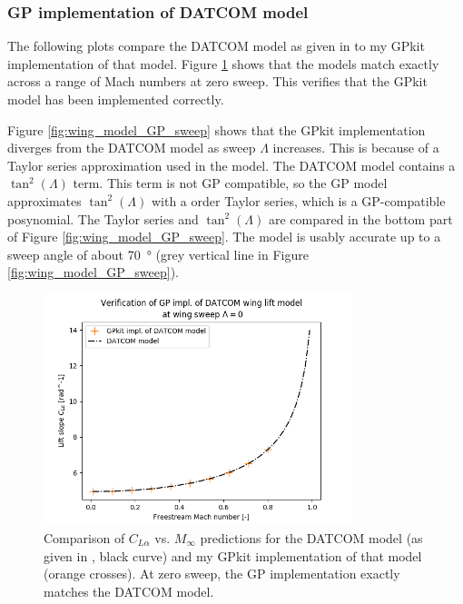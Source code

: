 \documentclass[12pt]{article}
\begin{document}
\subsubsection{GP implementation of DATCOM model}
The following plots compare the DATCOM model as given in \cite{Raymer2012} to my GPkit implementation of that model. Figure \ref{fig:wing_model_GP_mach} shows that the models match exactly across a range of Mach numbers at zero sweep. This verifies that the GPkit model has been implemented correctly.

Figure \ref{fig:wing_model_GP_sweep} shows that the GPkit implementation diverges from the DATCOM model as sweep $\Lambda$ increases. This is because of a Taylor series approximation used in the model. The DATCOM model contains a $\tan^2(\Lambda)$ term. This term is not GP compatible, so the GP model approximates $\tan^2(\Lambda)$ with a  order Taylor series, which is a GP-compatible posynomial. The Taylor series and $\tan^2(\Lambda)$ are compared in the bottom part of Figure \ref{fig:wing_model_GP_sweep}. The model is usably accurate up to a sweep angle of about \SI{70}{\degree} (grey vertical line in Figure \ref{fig:wing_model_GP_sweep}).

\begin{figure}[hbt!]
    \centering
    \includegraphics[width=0.8\textwidth]{figures/wing_lift_model_compare/GP_mach}
    \caption{\label{fig:wing_model_GP_mach} Comparison of $C_{L\alpha}$ vs. $M_\infty$ predictions for the DATCOM model (as given in \cite{Raymer2012}, black curve) and my GPkit implementation of that model (orange crosses). At zero sweep, the GP implementation exactly matches the DATCOM model.}
\end{figure}
\end{document}
